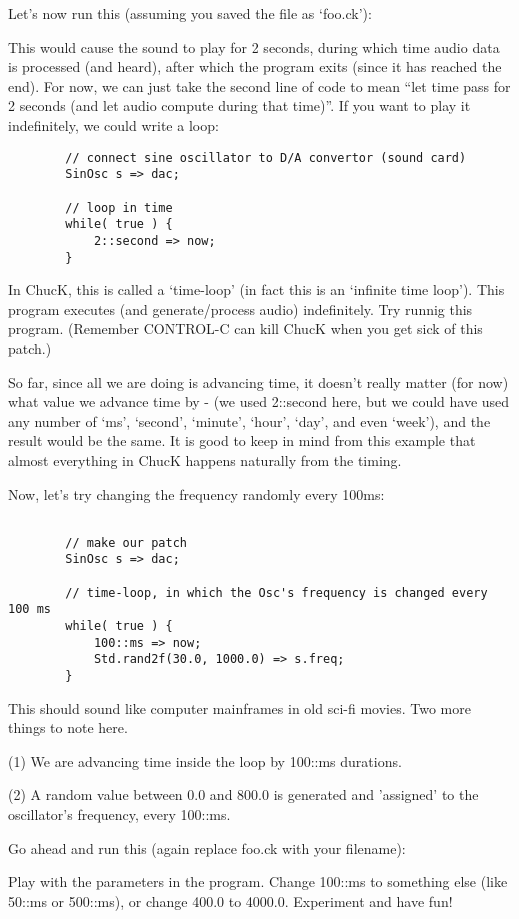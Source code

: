 Let's now run this (assuming you saved the file as `foo.ck'):


This would cause the sound to play for 2 seconds, during which time audio data is processed (and heard), after which the program exits (since it has reached the end). For now, we can just take the second line of code to mean ``let time pass for 2 seconds (and let audio compute during that time)''. If you want to play it indefinitely, we could write a loop:

\begin{verbatim}
        // connect sine oscillator to D/A convertor (sound card)
        SinOsc s => dac;

        // loop in time
        while( true ) {
            2::second => now;
        }
\end{verbatim}

In ChucK, this is called a `time-loop' (in fact this is an `infinite time loop'). This program executes (and generate/process audio) indefinitely. Try runnig this program. (Remember CONTROL-C can kill ChucK when you get sick of this patch.)

So far, since all we are doing is advancing time, it doesn't really matter (for now) what value we advance time by - (we used 2::second here, but we could have used any number of `ms', `second', `minute', `hour', `day', and even `week'), and the result would be the same. It is good to keep in mind from this example that almost everything in ChucK happens naturally from the timing. 

Now, let's try changing the frequency randomly every 100ms:
\begin{verbatim}

        // make our patch
        SinOsc s => dac;

        // time-loop, in which the Osc's frequency is changed every 100 ms
        while( true ) {
            100::ms => now;
            Std.rand2f(30.0, 1000.0) => s.freq;
        }
\end{verbatim}

This should sound like computer mainframes in old sci-fi movies. Two more things to note here. 

(1) We are advancing time inside the loop by 100::ms durations. 

(2) A random value between 0.0 and 800.0 is generated and 'assigned' to the oscillator's frequency, every 100::ms. 

Go ahead and run this (again replace foo.ck with your filename):

Play with the parameters in the program. Change 100::ms to something else (like 50::ms or 500::ms), or change 400.0 to 4000.0. Experiment and have fun!
